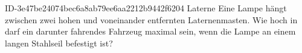 \begin{exercise}
      {ID-3e47be24074bec6a8ab79ee6aa2212b9442f6204}
      {Laterne}
  \ifproblem\problem
    Eine Lampe hängt zwischen zwei  hohen und  voneinander
    entfernten Laternenmasten. Wie hoch in darf ein darunter fahrendes Fahrzeug
    maximal sein, wenn die Lampe an einem  langen Stahlseil
    befestigt ist?
  \fi
\end{exercise}
